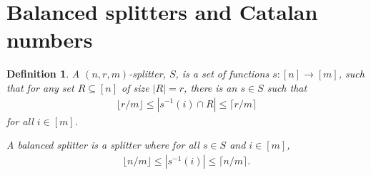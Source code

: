 \documentclass[11pt]{report}
\newtheorem{definition}{Definition}
\begin{document}
\section{Balanced splitters and Catalan numbers}
\begin{definition}
   A $(n,r,m)$-splitter, $S$, is a set of functions $s:[n]\to[m]$, such that for any set $R\subseteq[n]$ of size $|R|=r$, there is an $s\in S$ such that
   \begin{align*}
      \lfloor r/m\rfloor \le
      |s^{-1}(i)\cap R|
      \le\lceil r/m\rceil
   \end{align*}
   for all $i\in[m]$.

   A balanced splitter is a splitter where for all $s\in S$ and $i\in[m]$,
   \begin{align*}
      \lfloor n/m\rfloor \le
      |s^{-1}(i)|
      \le\lceil n/m\rceil
      .
   \end{align*}
\end{definition}
\end{document}
